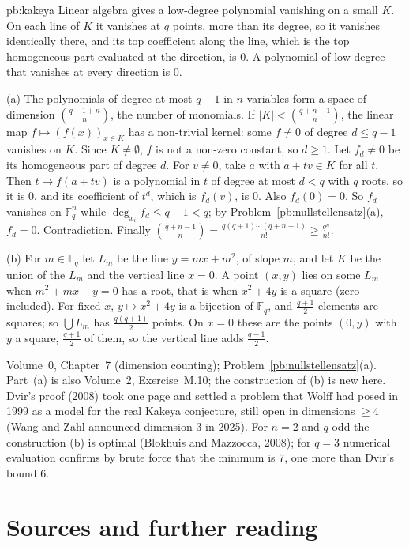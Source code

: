 \begin{solution}{pb:kakeya}
\idea Linear algebra gives a low-degree polynomial vanishing on a small $K$. On each line of $K$ it vanishes at $q$ points, more
than its degree, so it vanishes identically there, and its top coefficient along the line, which is the top homogeneous part
evaluated at the direction, is $0$. A polynomial of low degree that vanishes at every direction is $0$.

\writeup (a) The polynomials of degree at most $q-1$ in $n$ variables form a space of dimension $\binom{q-1+n}n$, the number of
monomials. If $|K|<\binom{q+n-1}n$, the linear map $f\mapsto(f(x))_{x\in K}$ has a non-trivial kernel: some $f\ne0$ of degree
$d\le q-1$ vanishes on $K$. Since $K\ne\emptyset$, $f$ is not a non-zero constant, so $d\ge1$. Let $f_d\ne0$ be its homogeneous part of
degree $d$. For $v\ne0$, take $a$ with $a+tv\in K$ for all $t$. Then $t\mapsto f(a+tv)$ is a polynomial in $t$ of degree at most $d<q$
with $q$ roots, so it is $0$, and its coefficient of $t^d$, which is $f_d(v)$, is $0$. Also $f_d(0)=0$. So $f_d$ vanishes on
$\mathbb F_q^n$ while $\deg_{x_i}f_d\le q-1<q$; by Problem~\ref{pb:nullstellensatz}(a), $f_d=0$. Contradiction. Finally
$\binom{q+n-1}n=\frac{q(q+1)\cdots(q+n-1)}{n!}\ge\frac{q^n}{n!}$.

(b) For $m\in\mathbb F_q$ let $L_m$ be the line $y=mx+m^2$, of slope $m$, and let $K$ be the union of the $L_m$ and the vertical line
$x=0$. A point $(x,y)$ lies on some $L_m$ when $m^2+mx-y=0$ has a root, that is when $x^2+4y$ is a square (zero included). For fixed
$x$, $y\mapsto x^2+4y$ is a bijection of $\mathbb F_q$, and $\frac{q+1}2$ elements are squares; so $\bigcup L_m$ has $\frac{q(q+1)}2$
points. On $x=0$ these are the points $(0,y)$ with $y$ a square, $\frac{q+1}2$ of them, so the vertical line adds $\frac{q-1}2$.

\tools Volume~0, Chapter~7 (dimension counting); Problem~\ref{pb:nullstellensatz}(a). Part~(a) is also Volume~2, Exercise~M.10; the construction of (b) is new here.
\leads Dvir's proof (2008) took one page and settled a problem that Wolff had posed in 1999 as a model for the real Kakeya
conjecture, still open in dimensions $\ge4$ (Wang and Zahl announced dimension $3$ in 2025). For $n=2$ and $q$ odd the
construction (b) is optimal (Blokhuis and Mazzocca, 2008); for $q=3$ numerical evaluation confirms by brute force that the minimum is $7$,
one more than Dvir's bound $6$.
\end{solution}

\section*{Sources and further reading}

